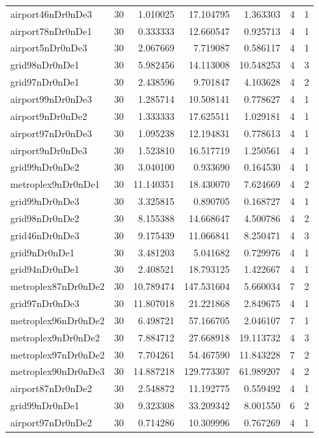 \begin{longtable}{|l|r|r|r|r|r|r|}
airport46nDr0nDe3 & 30 & 1.010025 & 17.104795 & 1.363303 & 4 & 1 \\
airport78nDr0nDe1 & 30 & 0.333333 & 12.660547 & 0.925713 & 4 & 1 \\
airport5nDr0nDe3 & 30 & 2.067669 & 7.719087 & 0.586117 & 4 & 1 \\
grid98nDr0nDe1 & 30 & 5.982456 & 14.113008 & 10.548253 & 4 & 3 \\
grid97nDr0nDe1 & 30 & 2.438596 & 9.701847 & 4.103628 & 4 & 2 \\
airport99nDr0nDe3 & 30 & 1.285714 & 10.508141 & 0.778627 & 4 & 1 \\
airport9nDr0nDe2 & 30 & 1.333333 & 17.625511 & 1.029181 & 4 & 1 \\
airport97nDr0nDe3 & 30 & 1.095238 & 12.194831 & 0.778613 & 4 & 1 \\
airport9nDr0nDe3 & 30 & 1.523810 & 16.517719 & 1.250561 & 4 & 1 \\
grid99nDr0nDe2 & 30 & 3.040100 & 0.933690 & 0.164530 & 4 & 1 \\
metroplex9nDr0nDe1 & 30 & 11.140351 & 18.430070 & 7.624669 & 4 & 2 \\
grid99nDr0nDe3 & 30 & 3.325815 & 0.890705 & 0.168727 & 4 & 1 \\
grid98nDr0nDe2 & 30 & 8.155388 & 14.668647 & 4.500786 & 4 & 2 \\
grid46nDr0nDe3 & 30 & 9.175439 & 11.066841 & 8.250471 & 4 & 3 \\
grid9nDr0nDe1 & 30 & 3.481203 & 5.041682 & 0.729976 & 4 & 1 \\
grid94nDr0nDe1 & 30 & 2.408521 & 18.793125 & 1.422667 & 4 & 1 \\
metroplex87nDr0nDe2 & 30 & 10.789474 & 147.531604 & 5.660034 & 7 & 2 \\
grid97nDr0nDe3 & 30 & 11.807018 & 21.221868 & 2.849675 & 4 & 1 \\
metroplex96nDr0nDe2 & 30 & 6.498721 & 57.166705 & 2.046107 & 7 & 1 \\
metroplex9nDr0nDe2 & 30 & 7.884712 & 27.668918 & 19.113732 & 4 & 3 \\
metroplex97nDr0nDe2 & 30 & 7.704261 & 54.467590 & 11.843228 & 7 & 2 \\
metroplex90nDr0nDe3 & 30 & 14.887218 & 129.773307 & 61.989207 & 4 & 2 \\
airport87nDr0nDe2 & 30 & 2.548872 & 11.192775 & 0.559492 & 4 & 1 \\
grid99nDr0nDe1 & 30 & 9.323308 & 33.209342 & 8.001550 & 6 & 2 \\
airport97nDr0nDe2 & 30 & 0.714286 & 10.309996 & 0.767269 & 4 & 1 \\

\end{longtable}
